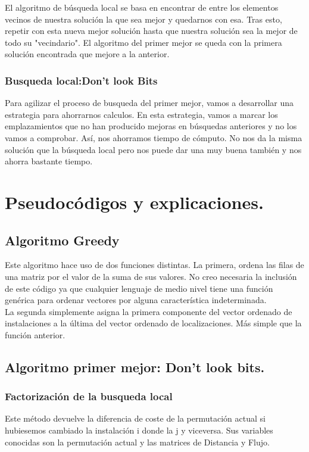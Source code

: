 El algoritmo de búsqueda local se basa en encontrar de entre los elementos vecinos de nuestra solución la que sea mejor y quedarnos con esa. Tras esto, repetir con esta nueva mejor solución hasta que nuestra solución sea la mejor de todo su "vecindario". El algoritmo del primer mejor se queda con la primera solución encontrada que mejore a la anterior.

\subsubsection{Busqueda local:Don't look Bits}
Para agilizar el proceso de busqueda del primer mejor, vamos a desarrollar una estrategia para ahorrarnos calculos. En esta estrategia, vamos a marcar los emplazamientos que no han producido mejoras en búsquedas anteriores y no los vamos a comprobar. Así, nos ahorramos tiempo de cómputo. No nos da la misma solución que la búsqueda local pero nos puede dar una muy buena también y nos ahorra bastante tiempo.

\newpage
\section{Pseudocódigos y explicaciones.}

\subsection{Algoritmo Greedy}
Este algoritmo hace uso de dos funciones distintas. La primera, ordena las filas de una matriz por el valor de la suma de sus valores. No creo necesaria la inclusión de este código ya que cualquier lenguaje de medio nivel tiene una función genérica para ordenar vectores por alguna característica indeterminada. \\
La segunda simplemente asigna la primera componente del vector ordenado de instalaciones a la última del vector ordenado de localizaciones. Más simple que la función anterior.

\subsection{Algoritmo primer mejor: Don't look bits.}

\subsubsection{Factorización de la busqueda local}
Este método devuelve la diferencia de coste de la permutación actual si hubiesemos cambiado la instalación i donde la j y viceversa. Sus variables conocidas son la permutación actual y las matrices de Distancia y Flujo.\\


